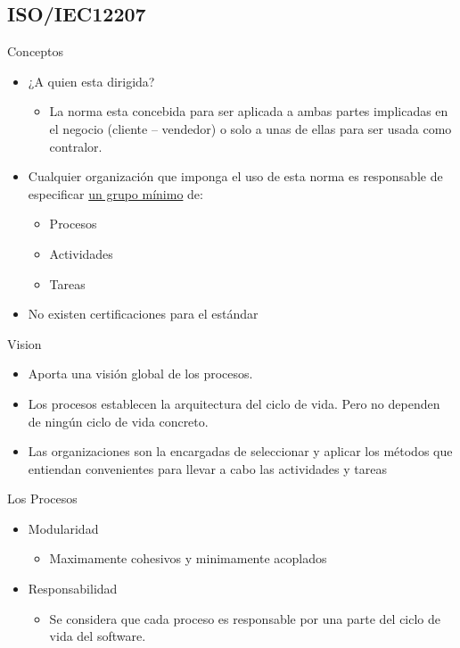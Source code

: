 \documentclass{beamer}
\begin{document}
			
			\subsection{ISO/IEC12207}
			\begin{frame}{Conceptos}
				\begin{itemize}
					\item ¿A quien esta dirigida?
					\begin{itemize}
						\item La norma esta concebida para ser aplicada a ambas partes implicadas en el negocio (cliente – vendedor) o solo a unas de ellas para ser usada como contralor.
					\end{itemize}
					
					\item Cualquier organización que imponga el uso de esta norma es responsable de especificar \underline{un grupo mínimo} de:
				
					\begin{itemize}
						\item Procesos
						\item Actividades
						\item Tareas
					\end{itemize}
				
					\item No existen certificaciones para el estándar
				\end{itemize}
			\end{frame}

			\begin{frame}{Vision}
				\begin{itemize}
					\item Aporta una visión global de los procesos.
					\item Los procesos establecen la arquitectura del ciclo de vida. Pero no dependen de ningún ciclo de vida concreto.
					\item Las organizaciones son la encargadas de seleccionar y aplicar los métodos que entiendan convenientes para llevar a cabo las actividades y tareas
				\end{itemize}
			\end{frame}
			
			\begin{frame}{Los Procesos}
			\begin{itemize}
				 \item Modularidad
				 \begin{itemize}
				 \item Maximamente cohesivos y minimamente acoplados 
				 \end{itemize}				  
				 \item Responsabilidad
				 \begin{itemize}
				 \item Se considera que cada proceso es responsable por una parte del ciclo de vida del software.
				 \end{itemize}
				 \end{itemize}
			\end{frame}
			
\end{document}
